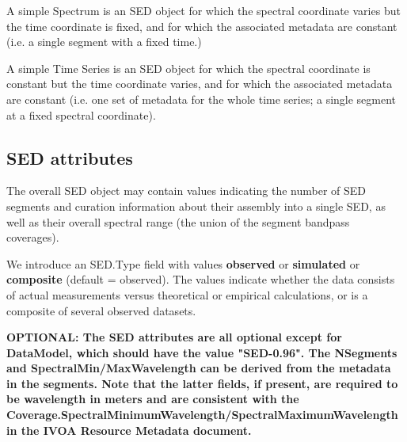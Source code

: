\documentclass[11pt]{article}
\begin{document}
A simple Spectrum is an SED object for which the spectral
coordinate varies but the time coordinate
is fixed, and for which the associated metadata are constant 
(i.e. a single segment with a fixed time.)

A simple Time Series is an SED object for which the spectral
coordinate is constant but the time coordinate
varies, and for which the associated metadata are constant (i.e. one
set of metadata for the whole time series; a single segment
at a fixed spectral coordinate).

\subsection{SED attributes}

The overall SED object may contain values indicating the
number of SED segments and curation information about their
assembly into a single SED, as well as their overall
spectral range (the union of the segment bandpass coverages).
 
We introduce an SED.Type field with values {\bf observed }  or {\bf simulated }  or
{\bf composite } 
(default = observed).
The values indicate whether the data consists of
actual measurements versus theoretical or empirical calculations, or is a composite
of several observed datasets.
 


 {\bf OPTIONAL: The SED attributes are all optional except for DataModel, which
should have the value "SED-0.96". The NSegments
and SpectralMin/MaxWavelength can be derived from the metadata in the segments.
Note that the latter fields, if present, are required to be wavelength in meters
and are consistent with the Coverage.SpectralMinimumWavelength/SpectralMaximumWavelength
in the IVOA Resource Metadata document.
 }  

  
\end{document}
